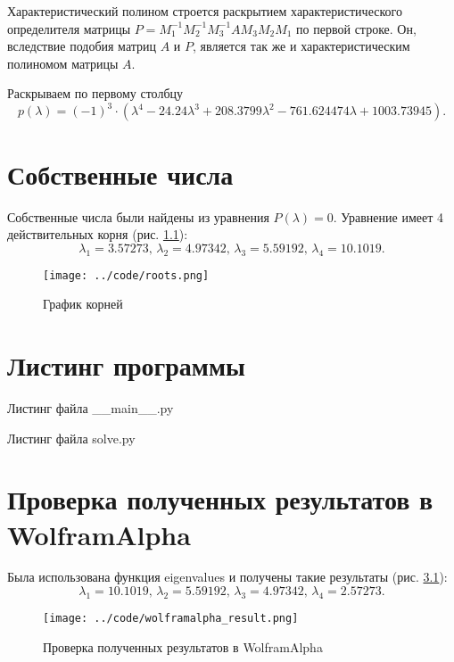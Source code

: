 Характеристический полином строется раскрытием характеристического определителя матрицы
$P = M_1^{-1} M_2^{-1} M_3^{-1} AM_3 M_2 M_1$ по первой строке.
Он, вследствие подобия матриц $A$ и $P$, является так же и характеристическим полиномом матрицы $A$.

Раскрываем по первому столбцу
$$p \left( \lambda \right) =
  \left( -1 \right)^3 \cdot
  \left(
    \lambda^4 - 24.24 \lambda^3 + 208.3799 \lambda^2 - 761.624474 \lambda + 1003.73945
  \right).$$

\chapter{Собственные числа}

Собственные числа были найдены из уравнения $P \left( \lambda \right) = 0$.
Уравнение имеет 4 действительных корня (рис. \ref{fig:roots}):
$$ \lambda_1 = 3.57273, \,
  \lambda_2 = 4.97342, \,
  \lambda_3 = 5.59192, \,
  \lambda_4 = 10.1019.$$

\begin{figure}[h!]
  \centering
  \texttt{[image: ../code/roots.png]}
  \caption{График корней}
  \label{fig:roots}
\end{figure}

\chapter{Листинг программы}

Листинг файла \_\_main\_\_.py
\lstset{inputencoding=utf8, extendedchars=\true}


Листинг файла solve.py
\lstset{inputencoding=utf8, extendedchars=\true}


\chapter{Проверка полученных результатов в WolframAlpha}

Была использована функция eigenvalues и получены такие результаты (рис. \ref{fig:wolfram}):
$$ \lambda_1 = 10.1019, \,
  \lambda_2 = 5.59192, \,
  \lambda_3 = 4.97342, \,
  \lambda_4 = 2.57273.$$

\begin{figure}[h!]
  \centering
  \texttt{[image: ../code/wolframalpha\_result.png]}
  \caption{Проверка полученных результатов в WolframAlpha}
  \label{fig:wolfram}
\end{figure}

